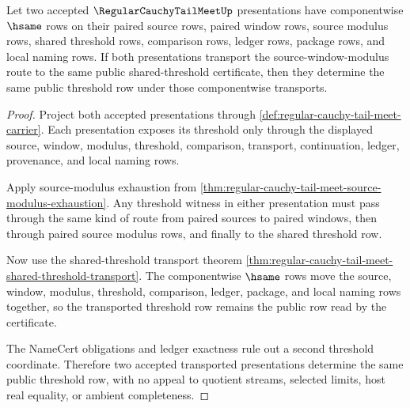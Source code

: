 \begin{theorem}
\label{thm:regular-cauchy-tail-meet-threshold-witness-determinacy}
Let two accepted $\RegularCauchyTailMeetUp$ presentations have componentwise $\hsame$ rows on their paired source rows, paired window rows, source modulus rows, shared threshold rows, comparison rows, ledger rows, package rows, and local naming rows. If both presentations transport the source-window-modulus route to the same public shared-threshold certificate, then they determine the same public threshold row under those componentwise transports.
\end{theorem}
\begin{proof}
Project both accepted presentations through \autoref{def:regular-cauchy-tail-meet-carrier}. Each presentation exposes its threshold only through the displayed source, window, modulus, threshold, comparison, transport, continuation, ledger, provenance, and local naming rows.

Apply source-modulus exhaustion from \autoref{thm:regular-cauchy-tail-meet-source-modulus-exhaustion}. Any threshold witness in either presentation must pass through the same kind of route from paired sources to paired windows, then through paired source modulus rows, and finally to the shared threshold row.

Now use the shared-threshold transport theorem \autoref{thm:regular-cauchy-tail-meet-shared-threshold-transport}. The componentwise $\hsame$ rows move the source, window, modulus, threshold, comparison, ledger, package, and local naming rows together, so the transported threshold row remains the public row read by the certificate.

The NameCert obligations and ledger exactness rule out a second threshold coordinate. Therefore two accepted transported presentations determine the same public threshold row, with no appeal to quotient streams, selected limits, host real equality, or ambient completeness.
\end{proof}

